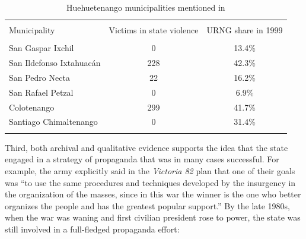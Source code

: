 \documentclass[12pt, notitlepage]{article}
\begin{document}
\begin{table}[!htbp] \centering
  \caption{Huehuetenango municipalities mentioned in \citet{Imparcial:1974aa}}\label{tab:6muni}
  \small

  \begin{tabular}{lcc}
  \\[-1.8ex]\hline
  \hline \\[-1.8ex]
  Municipality & Victims in state violence & URNG share in 1999  \\
  \hline \\[-1.8ex]
  San Gaspar Ixchil & 0 & 13.4\% \\
  San Ildefonso Ixtahuacán & 228 & 42.3\% \\
  San Pedro Necta & 22 & 16.2\% \\
  San Rafael Petzal & 0 & 6.9\% \\
  Colotenango & 299 & 41.7\% \\
  Santiago Chimaltenango & 0 & 31.4\% \\
  \hline
  \hline \\[-1.8ex]
  \end{tabular}

\end{table}

%


Third, both archival and qualitative evidence supports the idea that the state engaged in a strategy of propaganda that was in many cases successful.
For example, the army explicitly said in the \textit{Victoria 82} plan that one of their goals was ``to use the same procedures and techniques developed by the insurgency in the organization of the masses, since in this war the winner is the one who better organizes the people and has the greatest popular support.'' \citep[quoted in][II, 191]{CEH:1999aa}
By the late 1980s, when the war was waning and first civilian president rose to power, the state was still involved in a full-fledged propaganda effort:
\end{document}
